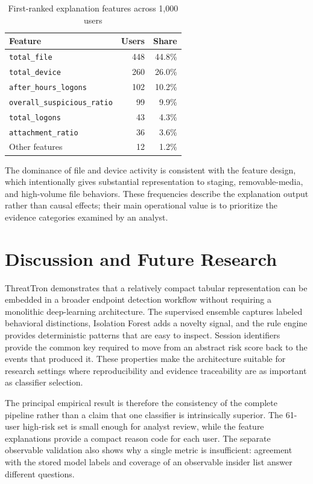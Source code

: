 \begin{table}[t]
\caption{First-ranked explanation features across 1,000 users}
\label{tab:explanations}
\centering
\footnotesize
\begin{tabular}{lrr}
\toprule
Feature & Users & Share \\
\midrule
\texttt{total\_file} & 448 & 44.8\% \\
\texttt{total\_device} & 260 & 26.0\% \\
\texttt{after\_hours\_logons} & 102 & 10.2\% \\
\texttt{overall\_suspicious\_ratio} & 99 & 9.9\% \\
\texttt{total\_logons} & 43 & 4.3\% \\
\texttt{attachment\_ratio} & 36 & 3.6\% \\
Other features & 12 & 1.2\% \\
\bottomrule
\end{tabular}
\end{table}

The dominance of file and device activity is consistent with the feature design, which intentionally gives substantial representation to staging, removable-media, and high-volume file behaviors. These frequencies describe the explanation output rather than causal effects; their main operational value is to prioritize the evidence categories examined by an analyst.

\section{Discussion and Future Research}
ThreatTron demonstrates that a relatively compact tabular representation can be embedded in a broader endpoint detection workflow without requiring a monolithic deep-learning architecture. The supervised ensemble captures labeled behavioral distinctions, Isolation Forest adds a novelty signal, and the rule engine provides deterministic patterns that are easy to inspect. Session identifiers provide the common key required to move from an abstract risk score back to the events that produced it. These properties make the architecture suitable for research settings where reproducibility and evidence traceability are as important as classifier selection.

The principal empirical result is therefore the consistency of the complete pipeline rather than a claim that one classifier is intrinsically superior. The 61-user high-risk set is small enough for analyst review, while the feature explanations provide a compact reason code for each user. The separate observable validation also shows why a single metric is insufficient: agreement with the stored model labels and coverage of an observable insider list answer different questions.

